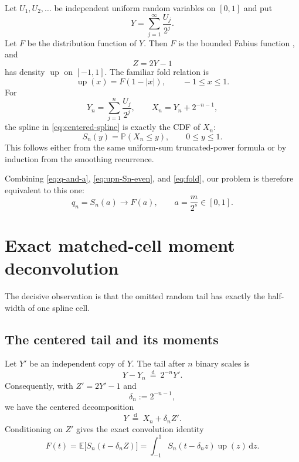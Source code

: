 \documentclass[11pt]{article}
\newcommand{\upf}{\operatorname{up}}
\newcommand{\E}{\mathbb{E}}
\newcommand{\Prob}{\mathbb{P}}
\newcommand{\dd}{\,\mathrm{d}}
\begin{document}
Let $U_1,U_2,\ldots$ be independent uniform random variables on $[0,1]$ and
put
\begin{equation}
 Y=\sum_{j=1}^{\infty}\frac{U_j}{2^j}.
 \label{eq:Y}
\end{equation}
Let $F$ be the distribution function of $Y$.  Then $F$ is the bounded Fabius
function \cite{fabius1966,arias1982,proveit}, and
\begin{equation}
 Z=2Y-1
 \label{eq:Z}
\end{equation}
has density $\upf$ on $[-1,1]$.  The familiar fold relation is
\begin{equation}
 \upf(x)=F(1-|x|),
 \qquad -1\le x\le1.
 \label{eq:fold}
\end{equation}
For
\begin{equation}
 Y_n=\sum_{j=1}^{n}\frac{U_j}{2^j},
 \qquad X_n=Y_n+2^{-n-1},
 \label{eq:Yn-Xn}
\end{equation}
the spline in \eqref{eq:centered-spline} is exactly the CDF of $X_n$:
\begin{equation}
 S_n(y)=\Prob(X_n\le y),
 \qquad 0\le y\le1.
 \label{eq:Sn-cdf}
\end{equation}
This follows either from the same uniform-sum truncated-power formula or by
induction from the smoothing recurrence.

Combining \eqref{eq:q-and-a}, \eqref{eq:upn-Sn-even}, and \eqref{eq:fold}, our
problem is therefore equivalent to this one:
\begin{equation}
 q_n=S_n(a)\longrightarrow F(a),
 \qquad a=\frac{m}{2^s}\in[0,1].
 \label{eq:reduced-problem}
\end{equation}

\section{Exact matched-cell moment deconvolution}

The decisive observation is that the omitted random tail has exactly the
half-width of one spline cell.

\subsection{The centered tail and its moments}

Let $Y'$ be an independent copy of $Y$.  The tail after $n$ binary scales is
\begin{equation}
 Y-Y_n\ \overset{\mathrm d}=\ 2^{-n}Y'.
\end{equation}
Consequently, with $Z'=2Y'-1$ and
\begin{equation}
 \delta_n:=2^{-n-1},
 \label{eq:delta}
\end{equation}
we have the centered decomposition
\begin{equation}
 Y\ \overset{\mathrm d}=\ X_n+\delta_n Z'.
 \label{eq:centered-tail-decomposition}
\end{equation}
Conditioning on $Z'$ gives the exact convolution identity
\begin{equation}
 F(t)=\E\bigl[S_n(t-\delta_n Z)\bigr]
 =\int_{-1}^{1}S_n(t-\delta_n z)\upf(z)\dd z.
 \label{eq:F-Sn-convolution}
\end{equation}
\end{document}
